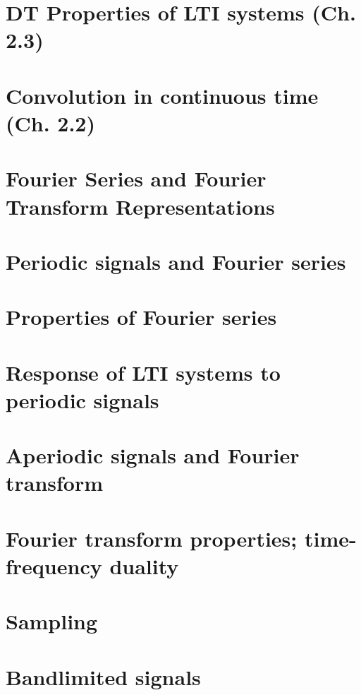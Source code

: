 \documentclass{article}
\begin{document}
\section{DT Properties of LTI systems (Ch. 2.3)} %

\newpage

\section{Convolution in continuous time (Ch. 2.2)}

\newpage

\section*{Fourier Series and Fourier Transform Representations}
\section{Periodic signals and Fourier series}

\newpage

\section{Properties of Fourier series}

\newpage

\section{Response of LTI systems to periodic signals}

\newpage

\section{Aperiodic signals and Fourier transform}
\newpage

\section{Fourier transform properties; time-frequency duality}
\newpage

\section*{Sampling}
\section{Bandlimited signals}
\newpage
\end{document}
